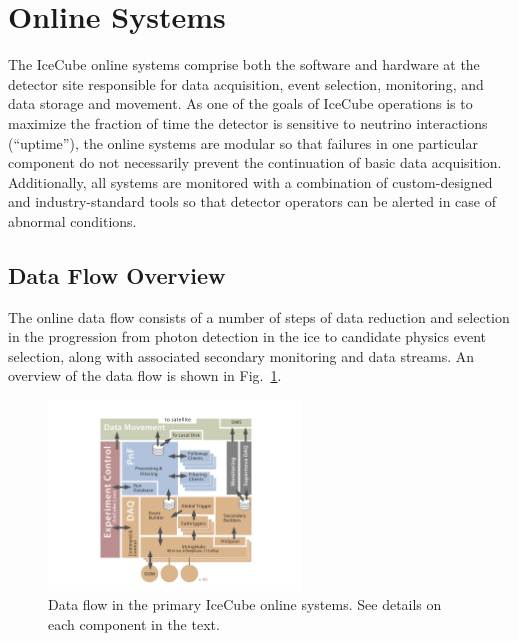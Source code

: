 
\section{\label{sect:online}Online Systems}

The IceCube online systems comprise both the software and hardware at the
detector site responsible for data acquisition, event selection,
monitoring, and data storage and movement.  As one of the goals of IceCube
operations is to maximize the fraction of time the detector is sensitive to
neutrino interactions (``uptime''), the online systems are modular so that
failures in one particular component do not necessarily prevent the
continuation of basic data acquisition. Additionally, all systems are
monitored with a combination of custom-designed and industry-standard tools
so that detector operators can be alerted in case of abnormal conditions.

\subsection{\label{sect:online:dataflow}Data Flow Overview}

The online data flow consists of a number of steps of data reduction and
selection in the progression from photon detection in the ice to
candidate physics event selection, along with associated secondary
monitoring and data streams.  An overview of the data flow is shown in
Fig.~\ref{fig:online_dataflow}.

\begin{figure}[!ht]
 \centering
 \includegraphics[width=0.6\textwidth]{graphics/online/online_dataflow.pdf}
 \caption{Data flow in the primary IceCube online systems. See details
   on each component in the text.}
 \label{fig:online_dataflow}
\end{figure}

